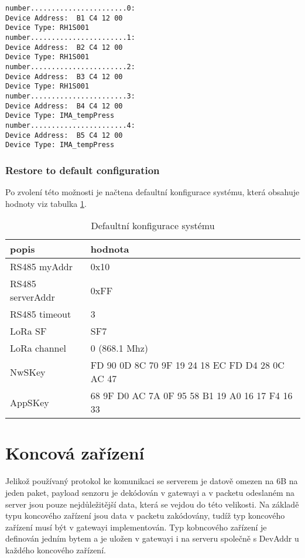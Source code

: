\begin{lstlisting}
number.......................0:
Device Address:  B1 C4 12 00
Device Type: RH1S001
number.......................1:
Device Address:  B2 C4 12 00
Device Type: RH1S001
number.......................2:
Device Address:  B3 C4 12 00
Device Type: RH1S001
number.......................3:
Device Address:  B4 C4 12 00
Device Type: IMA_tempPress
number.......................4:
Device Address:  B5 C4 12 00
Device Type: IMA_tempPress
\end{lstlisting}



\subsubsection{Restore to default configuration}
Po zvolení této možnosti je načtena defaultní konfigurace systému, která obsahuje hodnoty viz tabulka \ref{table:5}.

\begin{table}[!h]
    \centering
    \begin{tabular}{ |l|l| }
     \hline

     popis              & hodnota         \\ \hline \hline
     RS485 myAddr       & 0x10            \\ \hline
     RS485 serverAddr   & 0xFF            \\ \hline
     RS485 timeout      & 3               \\ \hline
     LoRa SF            & SF7             \\ \hline
     LoRa channel       & 0 (868.1 Mhz)   \\ \hline
     NwSKey             & FD 90 0D 8C 70 9F 19 24 18 EC FD D4 28 0C AC 47  \\ \hline
     AppSKey            & 68 9F D0 AC 7A 0F 95 58 B1 19 A0 16 17 F4 16 33  \\ \hline

    \end{tabular}
    \caption{Defaultní konfigurace systému}
    \label{table:5}
\end{table}


\newpage
\section{Koncová zařízení}
Jelikož používaný protokol ke komunikaci se serverem je datově omezen na 6B na jeden paket, payload senzoru je dekódován v gatewayi a v packetu odeslaném na server jsou pouze nejdůležitější data, která se vejdou do této velikosti.
Na základě typu koncového zařízení jsou data v packetu zakódovány, tudíž typ koncového zařízení musí být v gatewayi implementován.
Typ kobncového zařízení je definován jedním bytem a je uložen v gatewayi i na serveru společně s DevAddr u každého koncového zařízení.

